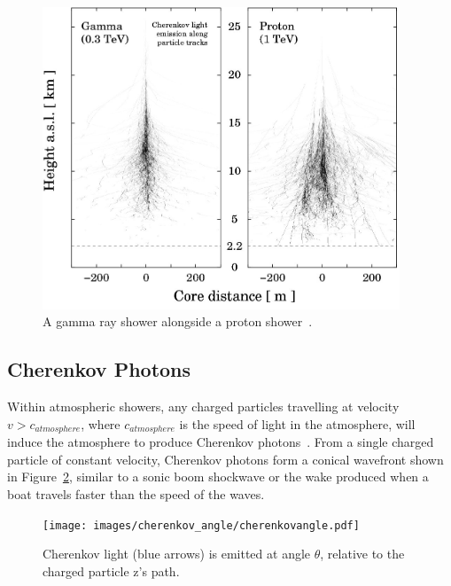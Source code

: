   \begin{figure}[ht]
    \centering
    \includegraphics[width=0.95\textwidth]{images/showers_gamma_proton}
    \caption[Gamma Ray and Proton Showers]{
      A gamma ray shower alongside a proton shower~\cite{Bernlohr2008149}.
    }
    \label{fig:gamma_vs_proton_airshower}
  \end{figure}
  
  \FloatBarrier

  \subsection{Cherenkov Photons}\label{sec:cherenkov}

  Within atmospheric showers, any charged particles travelling at velocity $v > c_{atmosphere}$, where $c_{atmosphere}$ is the speed of light in the atmosphere, will induce the atmosphere to produce Cherenkov photons~\cite{cherenkov}.
  From a single charged particle of constant velocity, Cherenkov photons form a conical wavefront shown in Figure~\ref{fig:cherenkovangle}, similar to a sonic boom shockwave or the wake produced when a boat travels faster than the speed of the waves.

  \begin{figure}[ht]
    \centering
    \texttt{[image: images/cherenkov\_angle/cherenkovangle.pdf]}
    \caption[Chernekov Emission Angle]{
      Cherenkov light (blue arrows) is emitted at angle $\theta$, relative to the charged particle z's path.
    }
    \label{fig:cherenkovangle}
  \end{figure}

